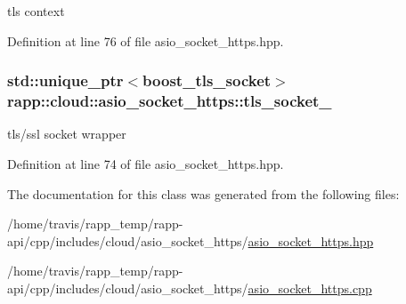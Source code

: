 tls context 



Definition at line 76 of file asio\-\_\-socket\-\_\-https.\-hpp.

\hypertarget{classrapp_1_1cloud_1_1asio__socket__https_a35bcea020d1f2efb9c367b9c9ef40153}{
\subsubsection[{tls\-\_\-socket\-\_\-}]{\setlength{\rightskip}{0pt plus 5cm}std\-::unique\-\_\-ptr$<${\bf boost\-\_\-tls\-\_\-socket}$>$ rapp\-::cloud\-::asio\-\_\-socket\-\_\-https\-::tls\-\_\-socket\-\_\-\hspace{0.3cm}{\ttfamily [private]}}}\label{classrapp_1_1cloud_1_1asio__socket__https_a35bcea020d1f2efb9c367b9c9ef40153}


tls/ssl socket wrapper 



Definition at line 74 of file asio\-\_\-socket\-\_\-https.\-hpp.



The documentation for this class was generated from the following files\-:\begin{DoxyCompactItemize}
\item 
/home/travis/rapp\-\_\-temp/rapp-\/api/cpp/includes/cloud/asio\-\_\-socket\-\_\-https/\hyperlink{asio__socket__https_8hpp}{asio\-\_\-socket\-\_\-https.\-hpp}\item 
/home/travis/rapp\-\_\-temp/rapp-\/api/cpp/includes/cloud/asio\-\_\-socket\-\_\-https/\hyperlink{asio__socket__https_8cpp}{asio\-\_\-socket\-\_\-https.\-cpp}\end{DoxyCompactItemize}

